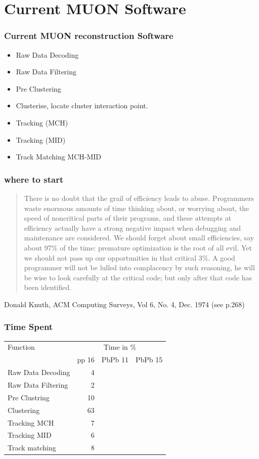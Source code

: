 \documentclass{beamer}
\begin{document}
\section{Current MUON Software}

\begin{frame}
\frametitle{Current MUON reconstruction Software}
\begin{itemize}
  \item Raw Data Decoding
  \item Raw Data Filtering
  \item Pre Clustering 
  \item Clusterise, locate cluster interaction point.
  \item Tracking (MCH)
  \item Tracking (MID)
  \item Track Matching MCH-MID
\end{itemize}
\end{frame}

\begin{frame}
  \frametitle{where to start}
  \begin{quote}
\small{There is no doubt that the grail of efficiency leads to abuse. Programmers waste enormous amounts of time thinking about, or worrying about, the speed of noncritical parts of their programs, and these attempts at efficiency actually have a strong negative impact when debugging and maintenance are considered. We should forget about small efficiencies, say about 97\% of the time: premature optimization is the root of all evil.
Yet we should not pass up our opportunities in that critical 3\%. A good programmer will not be lulled into complacency by such reasoning, he will be wise to look carefully at the critical code; but only after that code has been identified.}  
  \end{quote}
Donald Knuth, ACM Computing Surveys, Vol 6, No. 4, Dec. 1974 (see p.268)
\end{frame}

\begin{frame}
  \frametitle{Time Spent}

\begin{tabular}{|l|r|r|r|}
  Function & \multicolumn{3}{c}{Time in \%} \\  
  & pp 16  & PbPb 11 & PbPb 15\\ \hline 
Raw Data Decoding & 4 & &\\
Raw Data Filtering & 2 & &\\
Pre Clustring & 10 & &\\
Clustering & 63 & & \\
Tracking MCH & 7 & & \\
Tracking MID & 6 & & \\
Track matching & 8 & & \\
\end{tabular}\\
\vspace{2cm}
\end{frame}
\end{document}
